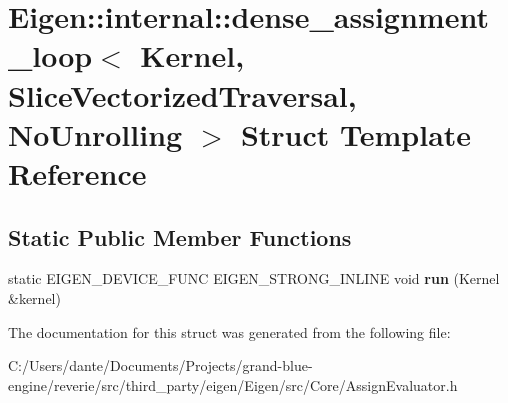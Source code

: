 \hypertarget{struct_eigen_1_1internal_1_1dense__assignment__loop_3_01_kernel_00_01_slice_vectorized_traversal_00_01_no_unrolling_01_4}{}\section{Eigen\+::internal\+::dense\+\_\+assignment\+\_\+loop$<$ Kernel, Slice\+Vectorized\+Traversal, No\+Unrolling $>$ Struct Template Reference}
\label{struct_eigen_1_1internal_1_1dense__assignment__loop_3_01_kernel_00_01_slice_vectorized_traversal_00_01_no_unrolling_01_4}
\subsection*{Static Public Member Functions}
\begin{DoxyCompactItemize}
\item 
\mbox{\label{struct_eigen_1_1internal_1_1dense__assignment__loop_3_01_kernel_00_01_slice_vectorized_traversal_00_01_no_unrolling_01_4_a293c80494b4f743a63dff2b5c2d8345c}} 
static E\+I\+G\+E\+N\+\_\+\+D\+E\+V\+I\+C\+E\+\_\+\+F\+U\+NC E\+I\+G\+E\+N\+\_\+\+S\+T\+R\+O\+N\+G\+\_\+\+I\+N\+L\+I\+NE void {\bfseries run} (Kernel \&kernel)
\end{DoxyCompactItemize}


The documentation for this struct was generated from the following file\+:\begin{DoxyCompactItemize}
\item 
C\+:/\+Users/dante/\+Documents/\+Projects/grand-\/blue-\/engine/reverie/src/third\+\_\+party/eigen/\+Eigen/src/\+Core/Assign\+Evaluator.\+h\end{DoxyCompactItemize}
